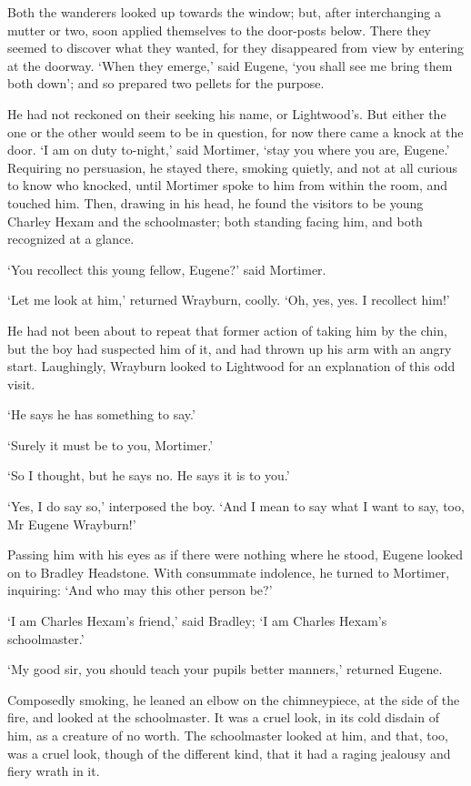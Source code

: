 Both the wanderers looked up towards the window; but, after
interchanging a mutter or two, soon applied themselves to the door-posts
below. There they seemed to discover what they wanted, for they
disappeared from view by entering at the doorway. ‘When they emerge,’
said Eugene, ‘you shall see me bring them both down’; and so prepared
two pellets for the purpose.

He had not reckoned on their seeking his name, or Lightwood’s. But
either the one or the other would seem to be in question, for now there
came a knock at the door. ‘I am on duty to-night,’ said Mortimer, ‘stay
you where you are, Eugene.’ Requiring no persuasion, he stayed there,
smoking quietly, and not at all curious to know who knocked, until
Mortimer spoke to him from within the room, and touched him. Then,
drawing in his head, he found the visitors to be young Charley Hexam
and the schoolmaster; both standing facing him, and both recognized at a
glance.

‘You recollect this young fellow, Eugene?’ said Mortimer.

‘Let me look at him,’ returned Wrayburn, coolly. ‘Oh, yes, yes. I
recollect him!’

He had not been about to repeat that former action of taking him by the
chin, but the boy had suspected him of it, and had thrown up his arm
with an angry start. Laughingly, Wrayburn looked to Lightwood for an
explanation of this odd visit.

‘He says he has something to say.’

‘Surely it must be to you, Mortimer.’

‘So I thought, but he says no. He says it is to you.’

‘Yes, I do say so,’ interposed the boy. ‘And I mean to say what I want
to say, too, Mr Eugene Wrayburn!’

Passing him with his eyes as if there were nothing where he stood,
Eugene looked on to Bradley Headstone. With consummate indolence, he
turned to Mortimer, inquiring: ‘And who may this other person be?’

‘I am Charles Hexam’s friend,’ said Bradley; ‘I am Charles Hexam’s
schoolmaster.’

‘My good sir, you should teach your pupils better manners,’ returned
Eugene.

Composedly smoking, he leaned an elbow on the chimneypiece, at the side
of the fire, and looked at the schoolmaster. It was a cruel look, in its
cold disdain of him, as a creature of no worth. The schoolmaster looked
at him, and that, too, was a cruel look, though of the different kind,
that it had a raging jealousy and fiery wrath in it.

